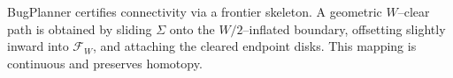 \begin{remark}
BugPlanner certifies connectivity via a frontier skeleton. A geometric $W$–clear path is obtained by sliding $\Sigma$ onto the $W/2$–inflated boundary, offsetting slightly inward into $\mathcal F_W$, and attaching the cleared endpoint disks. This mapping is continuous and preserves homotopy.
\end{remark}